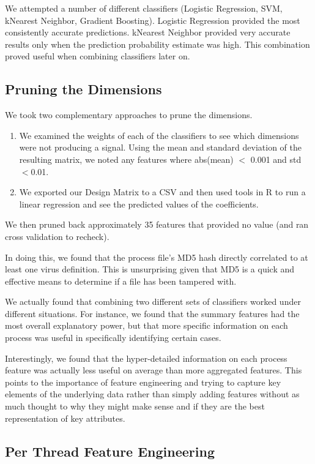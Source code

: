 \documentclass[11pt, oneside]{article}   	%
\begin{document}
We attempted a number of different classifiers (Logistic Regression, SVM, kNearest Neighbor, Gradient Boosting). Logistic Regression provided the most consistently accurate predictions. kNearest Neighbor provided very accurate results only when the prediction probability estimate was high. This combination proved useful when combining classifiers later on.

\subsection*{Pruning the Dimensions}

We took two complementary approaches to prune the dimensions.
\begin{enumerate}
  \item We examined the weights of each of the classifiers to see which dimensions were not producing a signal. Using the mean and standard deviation of the resulting matrix, we noted any features where abs(mean) $<$ 0.001 and std $< $0.01.
  \item We exported our Design Matrix to a CSV and then used tools in R to run a linear regression and see the predicted values of the coefficients. 
\end{enumerate}

We then pruned back approximately 35 features that provided no value (and ran cross validation to recheck).

In doing this, we found that the process file's MD5 hash directly correlated to at least one virus definition. This is unsurprising given that MD5 is a quick and effective means to determine if a file has been tampered with.

We actually found that combining two different sets of classifiers worked under different situations. For instance, we found that the summary features had the most overall explanatory power, but that more specific information on each process was useful in specifically identifying certain cases.

Interestingly, we found that the hyper-detailed information on each process feature was actually less useful on average than more aggregated features. This points to the importance of feature engineering and trying to capture key elements of the underlying data rather than simply adding features without as much thought to why they might make sense and if they are the best representation of key attributes.

\subsection*{Per Thread Feature Engineering}
\end{document}

